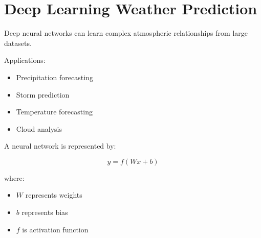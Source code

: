 \section{Deep Learning Weather Prediction}


Deep neural networks can learn complex atmospheric
relationships from large datasets.



Applications:


\begin{itemize}

\item Precipitation forecasting

\item Storm prediction

\item Temperature forecasting

\item Cloud analysis

\end{itemize}



A neural network is represented by:


\begin{equation}
y=f(Wx+b)
\end{equation}


where:

\begin{itemize}

\item $W$ represents weights

\item $b$ represents bias

\item $f$ is activation function

\end{itemize}
